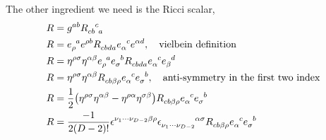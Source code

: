 The other ingredient we need is the Ricci scalar,
\begin{align*}
    R&=g^{ab}\tensor{R}{_c_b^c_a}\\
    R&=\tensor{e}{_\rho^a}\tensor{e}{^\rho^b}\tensor{R}{_c_b_d_a}\tensor{e}{_\alpha^c}\tensor{e}{^\alpha^d},\ \ \ \textnormal{vielbein definition}\\
    R&=\eta^{\rho\sigma}\eta^{\alpha\beta}\tensor{e}{_\rho^a}\tensor{e}{_\sigma^b}\tensor{R}{_c_b_d_a}\tensor{e}{_\alpha^c}\tensor{e}{_\beta^d}\\
    R&=\eta^{\rho\sigma}\eta^{\alpha\beta}\tensor{R}{_c_b_\beta_\rho}\tensor{e}{_\alpha^c}\tensor{e}{_\sigma^b},\ \ \ \textnormal{anti-symmetry in the first two index}\\
    R&=\frac12\qty(\eta^{\rho\sigma}\eta^{\alpha\beta}-\eta^{\rho\alpha}\eta^{\sigma\beta})\tensor{R}{_c_b_\beta_\rho}\tensor{e}{_\alpha^c}\tensor{e}{_\sigma^b}\\
    R&=\frac{-1}{2\qty(D-2)!}\tensor{\epsilon}{^{\nu_1}^\cdots^{\nu_{D-2}}^\beta^\rho}\tensor{\epsilon}{_{\nu_1}_\cdots_{\nu_{D-2}}^\alpha^\sigma}\tensor{R}{_c_b_\beta_\rho}\tensor{e}{_\alpha^c}\tensor{e}{_\sigma^b}
\end{align*}

